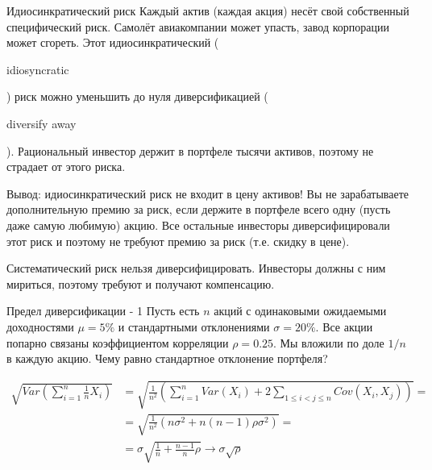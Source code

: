 \documentclass{beamer}
\newcommand{\en}[1]{\begin{otherlanguage}{english}#1\end{otherlanguage}}
\begin{document}
\begin{frame}{Идиосинкратический риск}
\justify
Каждый актив (каждая акция) несёт свой собственный специфический риск. Самолёт 
авиакомпании может упасть, завод корпорации может сгореть. Этот 
идиосинкратический (\en{idiosyncratic}) риск можно уменьшить до нуля 
диверсификацией (\en{diversify away}). Рациональный инвестор держит в портфеле 
тысячи активов, поэтому не страдает от этого риска.

\justify
Вывод: идиосинкратический риск не входит в цену активов! Вы не зарабатываете 
дополнительную премию за риск, если держите в портфеле всего одну (пусть даже 
самую любимую) акцию. Все остальные инвесторы диверсифицировали этот риск и 
поэтому не требуют премию за риск (т.е. скидку в цене).

\justify
Систематический риск нельзя диверсифицировать. Инвесторы должны с ним мириться, 
поэтому требуют и получают компенсацию.
\end{frame}



\begin{frame}{Предел диверсификации - 1}
\justify
Пусть есть $n$ акций с одинаковыми ожидаемыми доходностями $\mu=5\%$ и 
стандартными отклонениями $\sigma = 20\%$. Все акции попарно связаны 
коэффициентом корреляции $\rho=0.25$. Мы вложили по доле $1/n$ в каждую акцию. 
Чему равно стандартное отклонение портфеля?

\begin{align*}
\sqrt{Var\left(\sum\limits_{i=1}^{n}\frac{1}{n}X_i \right)} &=
\sqrt{\frac{1}{n^2}\left(\sum\limits_{i=1}^{n}Var(X_i) + 2\sum\limits_{
1 \le i < j \le n}Cov(X_i, X_j)\right)} = \\
&= \sqrt{\frac{1}{n^2}\left(n\sigma^2 + n(n-1)\rho\sigma^2\right)} = \\
&= \sigma\sqrt{\frac{1}{n} + \frac{n-1}{n}\rho} \to \sigma\sqrt{\rho}
\end{align*}
\end{frame}
\end{document}

